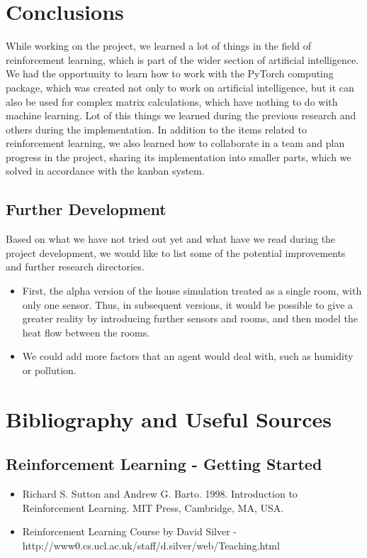 \documentclass{article}
\begin{document}
 

\section{Conclusions}
While working on the project, we learned a lot of things in the field of reinforcement learning, which is part of the wider section of artificial intelligence. We had the opportunity to learn how to work with the PyTorch computing package, which was created not only to work on artificial intelligence, but it can also be used for complex matrix calculations, which have nothing to do with machine learning. Lot of this things we learned during the previous research and others during the implementation. In addition to the items related to reinforcement learning, we also learned how to collaborate in a team and plan progress in the project, sharing its implementation into smaller parts, which we solved in accordance with the kanban system.
\subsection{Further Development}
Based on what we have not tried out yet and what have we read during the project development, we would like to list some of the potential improvements and further research directories.

\begin{itemize}
\item First, the alpha version of the house simulation treated as a single room, with only one sensor. Thus, in subsequent versions, it would be possible to give a greater reality by introducing further sensors and rooms, and then model the heat flow between the rooms.

\item We could add more factors that an agent would deal with, such as humidity or pollution.
\end{itemize}
\newpage
\section{Bibliography and Useful Sources}
\subsection{Reinforcement Learning - Getting Started}
\begin{itemize}
\item Richard S. Sutton and Andrew G. Barto. 1998. Introduction to Reinforcement Learning. MIT Press, Cambridge, MA, USA.
\item Reinforcement Learning Course by David Silver - http://www0.cs.ucl.ac.uk/staff/d.silver/web/Teaching.html
\end{itemize}
\end{document}
